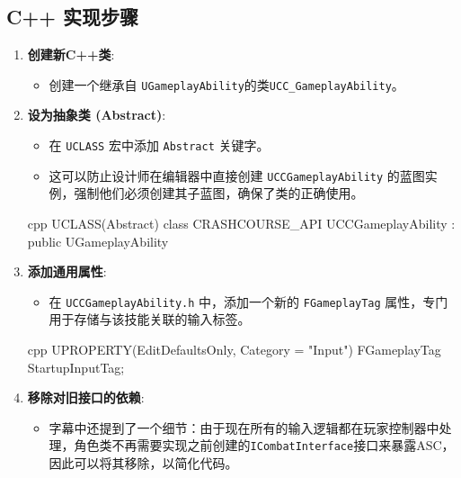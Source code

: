 \documentclass[10pt,CJKmath]{zhbook-v1}
\newcommand{\il}[1]{\texttt{#1}}%
\begin{document}
\subsection{C++ 实现步骤}
\begin{enumerate}
    \item \textbf{创建新C++类}:
    \begin{itemize}
        \item 创建一个继承自 \texttt{UGameplayAbility}的类\il{UCC_GameplayAbility}。
    \end{itemize}
    \item \textbf{设为抽象类 (Abstract)}:
    \begin{itemize}
        \item 在 \texttt{UCLASS} 宏中添加 \texttt{Abstract} 关键字。
        \item 这可以防止设计师在编辑器中直接创建 \texttt{UCCGameplayAbility} 的蓝图实例，强制他们必须创建其子蓝图，确保了类的正确使用。
    \end{itemize}
    \begin{amzcode}{cpp}
    UCLASS(Abstract)
    class CRASHCOURSE_API UCCGameplayAbility : public UGameplayAbility
    \end{amzcode}
    \item \textbf{添加通用属性}:
    \begin{itemize}
        \item 在 \texttt{UCCGameplayAbility.h} 中，添加一个新的 \texttt{FGameplayTag} 属性，专门用于存储与该技能关联的输入标签。
    \end{itemize}
    \begin{amzcode}{cpp}
    UPROPERTY(EditDefaultsOnly, Category = "Input")
    FGameplayTag StartupInputTag;
    \end{amzcode}
    \item \textbf{移除对旧接口的依赖}:
    \begin{itemize}
        \item 字幕中还提到了一个细节：由于现在所有的输入逻辑都在玩家控制器中处理，角色类不再需要实现之前创建的\texttt{ICombatInterface}接口来暴露ASC，因此可以将其移除，以简化代码。
    \end{itemize}
\end{enumerate}
\end{document}
